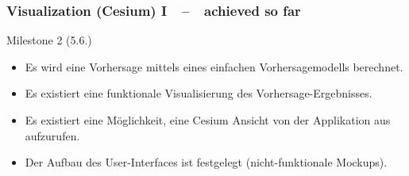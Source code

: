 \documentclass[xcolor=dvipsnames]{beamer}
\begin{document}
\begin{frame}
\begin{columns}
\begin{column}{0.5\textwidth}
\begin{center}
		\end{center}
	\end{column}
	\end{columns}
\end{frame}


\begin{frame}
	\frametitle{\textbf{Visualization (Cesium) I}~~--~~achieved so far}
	\large{Milestone 2 (5.6.)}
	\normalsize
	\begin{itemize} 
		\item \color{LightGray}Es wird eine Vorhersage mittels eines einfachen Vorhersagemodells berechnet.
		\item \color{LightGray}Es existiert eine funktionale Visualisierung des Vorhersage-Ergebnisses.
		\item \color{Green}Es existiert eine Möglichkeit, eine Cesium Ansicht von der Applikation aus aufzurufen.
		\item \color{LightGray}Der Aufbau des User-Interfaces ist festgelegt (nicht-funktionale Mockups).
	\end{itemize} 
\end{frame}
\end{document}
